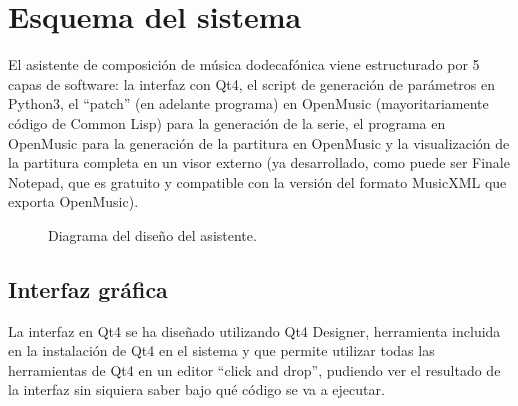\documentclass[a4paper,openany,oneside,12pt]{book}
\begin{document}
\section{Esquema del sistema}
El asistente de composición de música dodecafónica viene estructurado por 5 capas de software: la interfaz con Qt4, el script de generación de parámetros en Python3, el ``patch'' (en adelante programa) en OpenMusic (mayoritariamente código de Common Lisp) para la generación de la serie, el programa en OpenMusic para la generación de la partitura en OpenMusic y la visualización de la partitura completa en un visor externo (ya desarrollado, como puede ser Finale Notepad, que es gratuito y compatible con la versión del formato MusicXML que exporta OpenMusic).

\begin{figure}
\centering
\noindent{}
\caption{Diagrama del diseño del asistente.} \label{fig:softwarediagram}
\end{figure}

\subsection{Interfaz gráfica}

La interfaz en Qt4 se ha diseñado utilizando Qt4 Designer, herramienta incluida en la instalación de Qt4 en el sistema y que permite utilizar todas las herramientas de Qt4 en un editor ``click and drop'', pudiendo ver el resultado de la interfaz sin siquiera saber bajo qué código se va a ejecutar.
\end{document}
